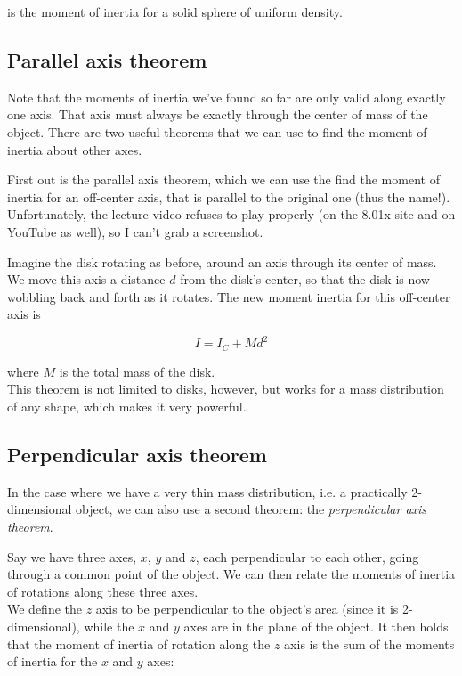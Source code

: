 \documentclass[8.01x]{subfiles}
\begin{document}
is the moment of inertia for a solid sphere of uniform density.

\subsection{Parallel axis theorem}

Note that the moments of inertia we've found so far are only valid along exactly one axis. That axis must always be exactly through the center of mass of the object. There are two useful theorems that we can use to find the moment of inertia about other axes.

First out is the parallel axis theorem, which we can use the find the moment of inertia for an off-center axis, that is parallel to the original one (thus the name!).\\
Unfortunately, the lecture video refuses to play properly (on the 8.01x site and on YouTube as well), so I can't grab a screenshot.

Imagine the disk rotating as before, around an axis through its center of mass. We move this axis a distance $d$ from the disk's center, so that the disk is now wobbling back and forth as it rotates. The new moment inertia for this off-center axis is

\begin{equation}
I = I_C + M d^2
\end{equation}

where $M$ is the total mass of the disk.\\
This theorem is not limited to disks, however, but works for a mass distribution of any shape, which makes it very powerful.

\subsection{Perpendicular axis theorem}

In the case where we have a very thin mass distribution, i.e. a practically 2-dimensional object, we can also use a second theorem: the \emph{perpendicular axis theorem}.

Say we have three axes, $x$, $y$ and $z$, each perpendicular to each other, going through a common point of the object. We can then relate the moments of inertia of rotations along these three axes.\\
We define the $z$ axis to be perpendicular to the object's area (since it is 2-dimensional), while the $x$ and $y$ axes are in the plane of the object. It then holds that the moment of inertia of rotation along the $z$ axis is the sum of the moments of inertia for the $x$ and $y$ axes:
\end{document}
